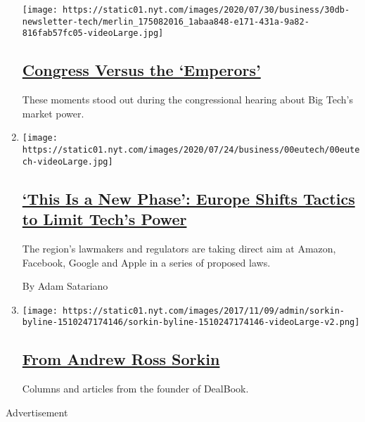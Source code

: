 \begin{enumerate}
  \texttt{[image: https://static01.nyt.com/images/2020/07/30/business/30db-newsletter-tech/merlin\_175082016\_1abaa848-e171-431a-9a82-816fab57fc05-videoLarge.jpg]}

  \hypertarget{congress-versus-the-emperors}{%
  \subsection{\texorpdfstring{\href{/2020/07/30/business/dealbook/tech-hearing-highlights.html}{Congress
  Versus the
  `Emperors'}}{Congress Versus the `Emperors'}}\label{congress-versus-the-emperors}}

  These moments stood out during the congressional hearing about Big
  Tech's market power.
\item
  \texttt{[image: https://static01.nyt.com/images/2020/07/24/business/00eutech/00eutech-videoLarge.jpg]}

  \hypertarget{this-is-a-new-phase-europe-shifts-tactics-to-limit-techs-power}{%
  \subsection{\texorpdfstring{\href{/2020/07/30/technology/europe-new-phase-tech-amazon-apple-facebook-google.html}{`This
  Is a New Phase': Europe Shifts Tactics to Limit Tech's
  Power}}{`This Is a New Phase': Europe Shifts Tactics to Limit Tech's Power}}\label{this-is-a-new-phase-europe-shifts-tactics-to-limit-techs-power}}

  The region's lawmakers and regulators are taking direct aim at Amazon,
  Facebook, Google and Apple in a series of proposed laws.

  By Adam Satariano
\item
  \texttt{[image: https://static01.nyt.com/images/2017/11/09/admin/sorkin-byline-1510247174146/sorkin-byline-1510247174146-videoLarge-v2.png]}

  \hypertarget{from-andrew-ross-sorkin}{%
  \subsection{\texorpdfstring{\href{/interactive/2017/business/dealbook/sorkin-byline.html}{From
  Andrew Ross
  Sorkin}}{From Andrew Ross Sorkin}}\label{from-andrew-ross-sorkin}}

  Columns and articles from the founder of DealBook.
\end{enumerate}

Advertisement

